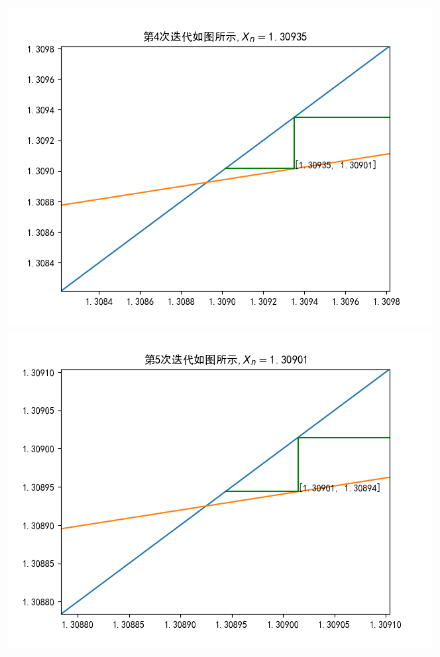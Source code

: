\documentclass[UTF8]{ctexart}
\begin{document}
\begin{figure}[h]
  \centering
  \begin{minipage}[t]{0.4\linewidth}
  \includegraphics[width=\linewidth]{第4次迭代.png}
  \end{minipage}%
  \begin{minipage}[t]{0.4\linewidth}
  \includegraphics[width=\linewidth]{第5次迭代.png}
  \end{minipage}
\end{figure}
\newpage
\end{document}
